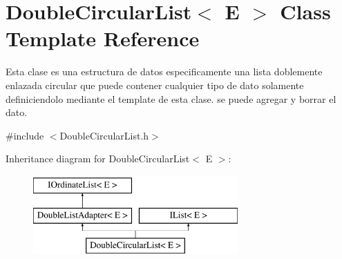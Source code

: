 \hypertarget{class_double_circular_list}{\section{Double\-Circular\-List$<$ E $>$ Class Template Reference}
\label{class_double_circular_list}
}


Esta clase es una estructura de datos especificamente una lista doblemente enlazada circular que puede contener cualquier tipo de dato solamente definiciendolo mediante el template de esta clase. se puede agregar y borrar el dato.  




{\ttfamily \#include $<$Double\-Circular\-List.\-h$>$}

Inheritance diagram for Double\-Circular\-List$<$ E $>$\-:\begin{figure}[H]
\begin{center}
\leavevmode
\includegraphics[height=3.000000cm]{class_double_circular_list}
\end{center}
\end{figure}
